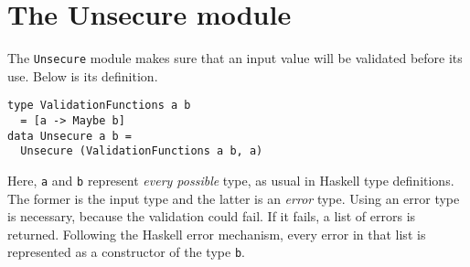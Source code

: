 \section{The Unsecure module}\label{sec:usecure}
The \texttt{Unsecure} module makes sure that an input value will be validated before its use. Below is its definition.
\begin{lstlisting}[frame=single]
type ValidationFunctions a b
  = [a -> Maybe b]
data Unsecure a b =  
  Unsecure (ValidationFunctions a b, a)
\end{lstlisting}
Here, \texttt{a} and \texttt{b} represent \textit{every possible} type, as usual in Haskell type definitions. The former is the input type and the latter is an \textit{error} type. Using an error type is necessary, because the validation could fail. If it fails, a list of errors is returned. Following the Haskell error mechanism, every error in that list is represented as a constructor of the type \texttt{b}. 

